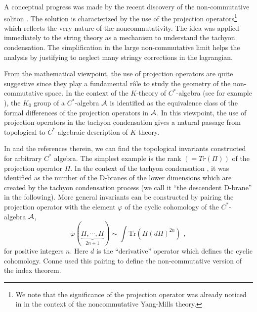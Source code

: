 \documentclass[a4paper,12pt]{article}
\begin{document}
A conceptual progress was made by the recent discovery of the 
non-commutative soliton \cite{r:GMS}.
The solution is characterized by the use of  the projection
operators\footnote{
We note that the significance of the projection operator
was already noticed in \cite{r:Fu} in the context
of the noncommutative Yang-Mills theory.
}
which reflects the very nature of the noncommutativity.
The idea was applied immediately \cite{r:Chicago}\cite{r:Indian} 
to the string theory as a mechanism to understand
the tachyon condensation.
The simplification in the large non-commutative
limit helps the analysis by justifying to neglect
many stringy corrections in the lagrangian.


{}From the mathematical viewpoint, the use of projection operators
are quite suggestive since they play a fundamental r\^ole 
to study the geometry of the non-commutative space.
In the context of the $K$-theory of $C^*$-algebra 
(see for example \cite{r:WO}),
the $K_0$ group of a $C^*$-algebra ${{\cal A}}$ is identified as the
equivalence class of the  formal differences 
of the projection operators in 
${{\cal A}}$. In this viewpoint, the use of projection operators
in the tachyon condensation gives a natural passage
from topological to $C^*$-algebraic description of $K$-theory.


In \cite{r:Conne} and the references therein, we can find
the  topological invariants constructed for arbitrary 
$C^*$ algebra.  The simplest example is
the rank $(=Tr(\Pi))$ of the projection operator $\Pi$.
In the context of the tachyon condensation \cite{r:Chicago},
it was identified as the number of 
the D-branes of the lower dimensions 
which are created by the tachyon condensation process
(we call it ``the descendent D-brane'' in the following).
More general invariants can be constructed by
pairing the projection operator with the element $\varphi$
of the cyclic cohomology of the $C^*$-algebra ${{\cal A}}$,
\begin{equation}\label{invariants}
\varphi(\underbrace{\Pi,\cdots,\Pi}_{2n+1})\sim \int \mbox{Tr}\left(\Pi (d\Pi)^{2n}\right)\,\,,
\end{equation}
for positive integers $n$. Here $d$ is the ``derivative''
operator which defines the cyclic cohomology.
Conne used this pairing to define the non-commutative
version of the index theorem. 
\end{document}
